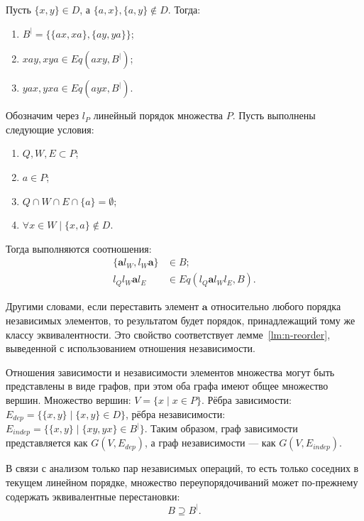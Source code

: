 Пусть $\{x, y\} \in D$, а $\{a, x\}, \{a, y\} \notin D$. Тогда:
\begin{enumerate}
  \item $B^{|} = \{\{ax, xa\}, \{ay, ya\}\}$;
  \item $xay, xya \in Eq(axy, B^{|})$;
  \item $yax, yxa \in Eq(ayx, B^{|})$.
\end{enumerate}

Обозначим через $l_{P}$ линейный порядок множества $P$. Пусть
выполнены следующие условия:
\begin{enumerate}
  \item $Q, W, E \subset P$;
  \item $a \in P$;
  \item $Q \cap W \cap E \cap \{a\} = \emptyset$;
  \item $\forall x \in W \mid \{x, a\} \not \in D$.
\end{enumerate}
Тогда выполняются соотношения:
\begin{equation}
  \begin{aligned}
    \{ \textbf{a}l_{W}, l_{W}\textbf{a} \} &\in B; \\
    l_{Q}l_{W}\textbf{a}l_{E} &\in Eq(l_{Q}\textbf{a}l_{W}l_{E}, B).
  \end{aligned}
  \label{eq:one_eq_class}
\end{equation}

Другими словами, если переставить элемент $\textbf{a}$ относительно
любого порядка независимых элементов, то результатом будет порядок,
принадлежащий тому же классу эквивалентности. Это свойство
соответствует лемме~\ref{lm:n-reorder}, выведенной с использованием
отношения независимости.

Отношения зависимости и независимости элементов множества могут быть
представлены в виде графов, при этом оба графа имеют общее множество
вершин. %
Множество вершин: $V = \{x \mid x \in P\}$. Рёбра зависимости:
$E_{dep} = \{\{x, y\} \mid \{x, y\} \in D\}$, рёбра независимости:
$E_{indep} = \{\{x, y\} \mid \{xy, yx\} \in B^{|}\}$. Таким образом,
граф зависимости представляется как $G(V, E_{dep})$, а граф
независимости — как $G(V, E_{indep})$.

В связи с анализом только пар независимых операций, то есть только
соседних в текущем линейном порядке, множество переупорядочиваний
может по-прежнему содержать эквивалентные перестановки:
\begin{equation}
  B \supseteq B^{|}.
  \label{eq:supset}
\end{equation}

